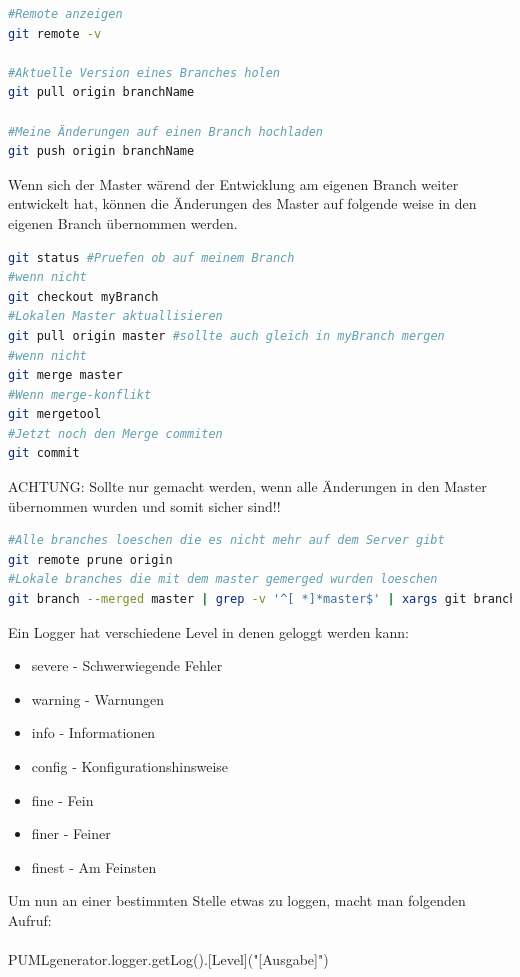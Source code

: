 \begin{lstlisting}[language=bash]
#Remote anzeigen
git remote -v

#Aktuelle Version eines Branches holen
git pull origin branchName

#Meine Änderungen auf einen Branch hochladen
git push origin branchName
\end{lstlisting}
\nsecend

Wenn sich der Master wärend der Entwicklung am eigenen Branch weiter entwickelt hat, können die Änderungen des Master auf folgende weise in den eigenen Branch übernommen werden.
\begin{lstlisting}[language=bash]
git status #Pruefen ob auf meinem Branch
#wenn nicht
git checkout myBranch
#Lokalen Master aktuallisieren
git pull origin master #sollte auch gleich in myBranch mergen
#wenn nicht
git merge master
#Wenn merge-konflikt
git mergetool
#Jetzt noch den Merge commiten
git commit
\end{lstlisting}
\nsecend

ACHTUNG: Sollte nur gemacht werden, wenn alle Änderungen in den Master übernommen wurden und somit sicher sind!!
\begin{lstlisting}[language=bash]
#Alle branches loeschen die es nicht mehr auf dem Server gibt
git remote prune origin
#Lokale branches die mit dem master gemerged wurden loeschen
git branch --merged master | grep -v '^[ *]*master$' | xargs git branch -d
\end{lstlisting}

\nsecend

\nsecend %

Ein Logger hat verschiedene Level in denen geloggt werden kann:
\begin{itemize}
\item severe	- Schwerwiegende Fehler
\item warning	- Warnungen
\item info	- Informationen
\item config	- Konfigurationshinsweise
\item fine	- Fein
\item finer	- Feiner
\item finest	- Am Feinsten
\end{itemize}
Um nun an einer bestimmten Stelle etwas zu loggen, macht man folgenden Aufruf: \\ \\
PUMLgenerator.logger.getLog().[Level]("[Ausgabe]")\\

